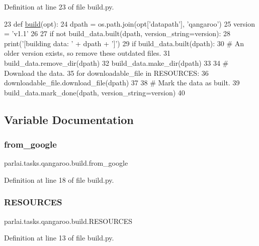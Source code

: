 Definition at line 23 of file build.\+py.


\begin{DoxyCode}
23 \textcolor{keyword}{def }\hyperlink{namespacedialog__babi__feedback_1_1build_a7a9d289f7493a5ded13c4b7f071b6184}{build}(opt):
24     dpath = os.path.join(opt[\textcolor{stringliteral}{'datapath'}], \textcolor{stringliteral}{'qangaroo'})
25     version = \textcolor{stringliteral}{'v1.1'}
26 
27     \textcolor{keywordflow}{if} \textcolor{keywordflow}{not} build\_data.built(dpath, version\_string=version):
28         print(\textcolor{stringliteral}{'[building data: '} + dpath + \textcolor{stringliteral}{']'})
29         \textcolor{keywordflow}{if} build\_data.built(dpath):
30             \textcolor{comment}{# An older version exists, so remove these outdated files.}
31             build\_data.remove\_dir(dpath)
32         build\_data.make\_dir(dpath)
33 
34         \textcolor{comment}{# Download the data.}
35         \textcolor{keywordflow}{for} downloadable\_file \textcolor{keywordflow}{in} RESOURCES:
36             downloadable\_file.download\_file(dpath)
37 
38         \textcolor{comment}{# Mark the data as built.}
39         build\_data.mark\_done(dpath, version\_string=version)
40 \end{DoxyCode}


\subsection{Variable Documentation}
\mbox{\label{namespaceparlai_1_1tasks_1_1qangaroo_1_1build_a391781ee6878917af2e1777861b763fb}} 
\subsubsection{\texorpdfstring{from\+\_\+google}{from\_google}}
{\footnotesize\ttfamily parlai.\+tasks.\+qangaroo.\+build.\+from\+\_\+google}



Definition at line 18 of file build.\+py.

\mbox{\label{namespaceparlai_1_1tasks_1_1qangaroo_1_1build_a9df9ad31290da5c6e60e353e6e69afa1}} 
\subsubsection{\texorpdfstring{R\+E\+S\+O\+U\+R\+C\+ES}{RESOURCES}}
{\footnotesize\ttfamily parlai.\+tasks.\+qangaroo.\+build.\+R\+E\+S\+O\+U\+R\+C\+ES}



Definition at line 13 of file build.\+py.

